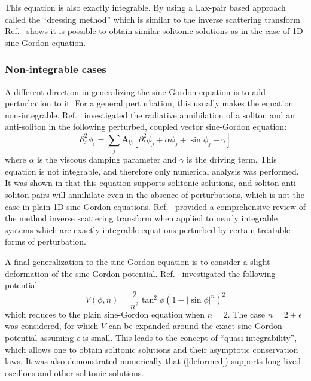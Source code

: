 \documentclass{report}
\begin{document}
This equation is also exactly integrable. By using a Lax-pair based approach called the ``dressing method'' which is similar to the inverse scattering transform Ref.~\cite{Mikhailov201653} shows it is possible to obtain similar solitonic solutions as in the case of 1D sine-Gordon equation.

\subsubsection{Non-integrable cases}
A different direction in generalizing the sine-Gordon equation is to add perturbation to it. For a general perturbation, this usually makes the equation non-integrable. Ref.~\cite{PhysRevB.85.134525} investigated the radiative annihilation of a soliton and an anti-soliton in the following perturbed, coupled vector sine-Gordon equation:
\begin{equation}
  \partial^2_x\phi_i=\sum_j \mathbf{A_{ij}} \left[\partial^2_t \phi_j +\alpha \phi_j +\sin \phi_j - \gamma\right]
\end{equation}
where $\alpha$ is the viscous damping parameter and $\gamma$ is the driving term. This equation is not integrable, and therefore only numerical analysis was performed. It was shown in \cite{PhysRevB.85.134525} that this equation supports solitonic solutions, and soliton-anti-soliton pairs will annihilate even in the absence of perturbations, which is not the case in plain 1D sine-Gordon equations.  Ref.~\cite{RevModPhys.61.763} provided a comprehensive review of the method inverse scattering transform when applied to nearly integrable systems which are exactly integrable equations perturbed by certain treatable forms of perturbation.

\medbreak

A final generalization to the sine-Gordon equation is to consider a slight deformation of the sine-Gordon potential. Ref.~\cite{Ferreira2011} investigated the following potential
\begin{equation}\label{deformed}
  V(\phi, n) = \frac{2}{n^2} \tan^2 \phi \left( 1 - \left|\sin\phi\right|^n \right)^2
\end{equation}
which reduces to the plain sine-Gordon equation when $n=2$. The case $n=2+\epsilon$ was considered, for which $V$ can be expanded around the exact sine-Gordon potential assuming $\epsilon$ is small. This leads to the concept of ``quasi-integrability'', which allows one to obtain solitonic solutions and their asymptotic conservation laws. It was also demonstrated numerically that (\ref{deformed}) supports long-lived oscillons and other solitonic solutions.
\end{document}
